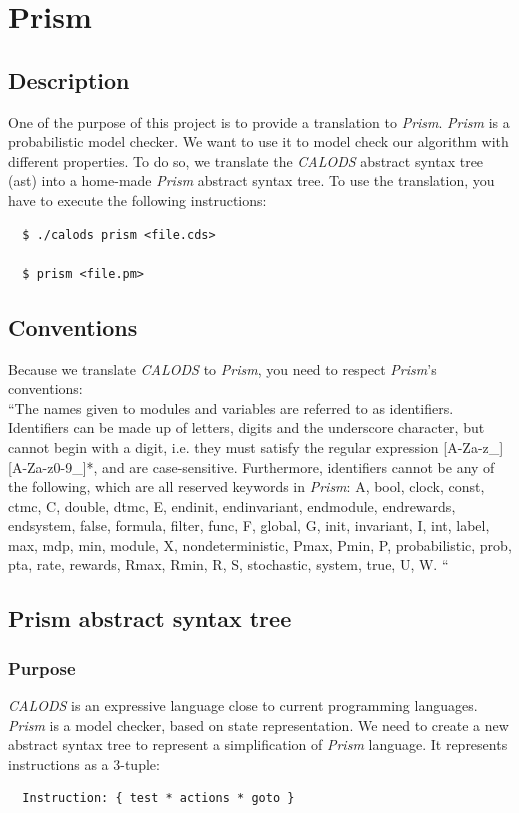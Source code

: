 \documentclass{article}
\begin{document}
\newpage 
 
\section{Prism}
\subsection{Description}
One of the purpose of this project is to provide a translation to \textit{Prism}. \textit{Prism} is a probabilistic model checker. We want to use it to model check our algorithm with different properties. To do so, we translate the \textit{CALODS} abstract syntax tree (ast) into a home-made \textit{Prism} abstract syntax tree. To use the translation, you have to execute the following instructions:
\begin{lstlisting}
  $ ./calods prism <file.cds>
  
  $ prism <file.pm>
\end{lstlisting}


\subsection{Conventions}
Because we translate \textit{CALODS} to \textit{Prism}, you need to respect \textit{Prism}'s conventions: \\
``The names given to modules and variables are referred to as identifiers. Identifiers can be made up of letters, digits and the underscore character, but cannot begin with a digit, i.e. they must satisfy the regular expression [A-Za-z_][A-Za-z0-9_]*, and are case-sensitive. Furthermore, identifiers cannot be any of the following, which are all reserved keywords in \textit{Prism}: A, bool, clock, const, ctmc, C, double, dtmc, E, endinit, endinvariant, endmodule, endrewards, endsystem, false, formula, filter, func, F, global, G, init, invariant, I, int, label, max, mdp, min, module, X, nondeterministic, Pmax, Pmin, P, probabilistic, prob, pta, rate, rewards, Rmax, Rmin, R, S, stochastic, system, true, U, W. `` \\

\subsection{Prism abstract syntax tree}
\subsubsection{Purpose}
\textit{CALODS} is an expressive language close to current programming languages. \textit{Prism} is a model checker, based on state representation. We need to create a new abstract syntax tree to represent a simplification of \textit{Prism} language. It represents instructions as a 3-tuple:
\begin{lstlisting}
  Instruction: { test * actions * goto }
\end{lstlisting}
\end{document}
